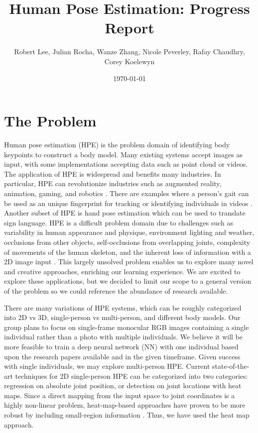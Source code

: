 \documentclass[11pt, letterpaper]{article}
\title{\textbf{Human Pose Estimation: Progress Report}}
\author{Robert Lee, Julian Rocha, Wanze Zhang, Nicole Peverley, Rafay Chaudhry, Corey Koelewyn}
\date{\today}
\begin{document}
\maketitle

\section{The Problem}

Human pose estimation (HPE) is the problem domain of identifying body keypoints to construct a body model. Many existing systems accept images as input, with some implementations accepting data such as point cloud or videos. The application of HPE is widespread and benefits many industries. In particular, HPE can revolutionize industries such as augmented reality, animation, gaming, and robotics \cite{fritz_ai_hpe}. There are examples where a person’s gait can be used as an unique fingerprint for tracking or identifying individuals in videos \cite{ZENG_2012_92}. Another subset of HPE is hand pose estimation which can be used to translate sign language. HPE is a difficult problem domain due to challenges such as variability in human appearance and physique, environment lighting and weather, occlusions from other objects, self-occlusions from overlapping joints, complexity of movements of the human skeleton, and the inherent loss of information with a 2D image input \cite{Sigal2014}. This largely unsolved problem enables us to explore many novel and creative approaches, enriching our learning experience. We are excited to explore these applications, but we decided to limit our scope to a general version of the problem so we could reference the abundance of research available.

There are many variations of HPE systems, which can be roughly categorized into 2D vs 3D, single-person vs multi-person, and different body models. Our group plans to focus on single-frame monocular RGB images containing a single individual rather than a photo with multiple individuals. We believe it will be more feasible to train a deep neural network (NN) with one individual based upon the research papers available and in the given timeframe. Given success with single individuals, we may explore multi-person HPE. Current state-of-the-art techniques for 2D single-person HPE can be categorized into two categories: regression on absolute joint position, or detection on joint locations with heat maps. Since a direct mapping from the input space to joint coordinates is a highly non-linear problem, heat-map-based approaches have proven to be more robust by including small-region information \cite{Chen_2020}. Thus, we have used the heat map approach.
\end{document}
